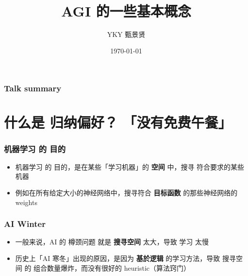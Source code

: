 \documentclass[17pt]{beamer}
\title[China AGI group]{AGI 的一些基本概念} %
\author{YKY 甄景贤} %
\institute[] %
{
Independent researcher, Hong Kong \\ %
\medskip
\textit{generic.intelligence@gmail.com} %
}
\date{\today} %
\begin{document}
\frame{\titlepage}

\begin{frame}
\frametitle{Talk summary}
\tableofcontents
\end{frame}

%
%




\section[什么是 归纳偏好？「没有免费午餐」]
{\texorpdfstring{什么是 归纳偏好？
\break 「没有免费午餐」}
{什么是 归纳偏好？「没有免费午餐」}}
\frame{\sectionpage}

\begin{frame}
\frametitle{机器学习 的 目的}
\begin{itemize}
	\item 机器学习 的 目的，是在某些「学习机器」的 \textbf{空间} 中，搜寻 符合要求的某些机器
	\item 例如在所有给定大小的神经网络中，搜寻符合 \textbf{目标函数} 的那些神经网络的 weights
\end{itemize}
\end{frame}

\begin{frame}
\frametitle{AI Winter}
\begin{itemize}
	\item 一般来说，AI 的 樽颈问题 就是 \textbf{搜寻空间} 太大，导致 学习 太慢
	\item 历史上「AI 寒冬」出现的原因，是因为 \textbf{基於逻辑} 的学习方法，导致 搜寻空间 的 组合数量爆炸，而没有很好的 heuristic（算法窍门）
\end{itemize}
\end{frame}
\end{document}
